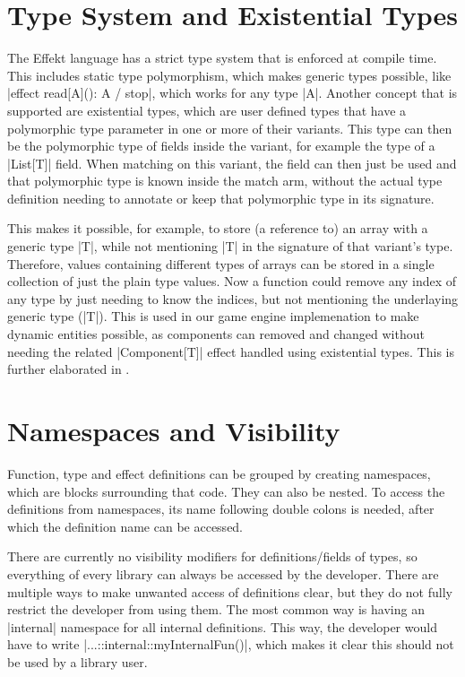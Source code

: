 \section{Type System and Existential Types}

The Effekt language has a strict type system that is enforced at compile time. This includes static type polymorphism, which makes generic types possible, like |effect read[A](): A / stop|, which works for any type |A|. Another concept that is supported are existential types, which are user defined types that have a polymorphic type parameter in one or more of their variants. This type can then be the polymorphic type of fields inside the variant, for example the type of a |List[T]| field. When matching on this variant, the field can then just be used and that polymorphic type is known inside the match arm, without the actual type definition needing to annotate or keep that polymorphic type in its signature.

This makes it possible, for example, to store (a reference to) an array with a generic type |T|, while not mentioning |T| in the signature of that variant's type. Therefore, values containing different types of arrays can be stored in a single collection of just the plain type values. Now a function could remove any index of any type by just needing to know the indices, but not mentioning the underlaying generic type (|T|). This is used in our game engine implemenation to make dynamic entities possible, as components can removed and changed without needing the related |Component[T]| effect handled using existential types. This is further elaborated in .

\section{Namespaces and Visibility}

Function, type and effect definitions can be grouped by creating namespaces, which are blocks surrounding that code. They can also be nested. To access the definitions from namespaces, its name following double colons is needed, after which the definition name can be accessed.

There are currently no visibility modifiers for definitions/fields of types, so everything of every library can always be accessed by the developer. There are multiple ways to make unwanted access of definitions clear, but they do not fully restrict the developer from using them. The most common way is having an |internal| namespace for all internal definitions. This way, the developer would have to write |...::internal::myInternalFun()|, which makes it clear this should not be used by a library user.
